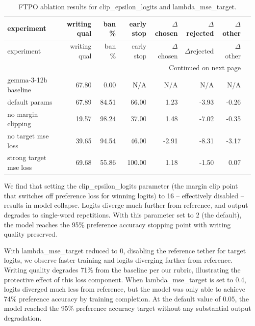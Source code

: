 \documentclass[11pt]{article}
\begin{document}
\setlength\LTleft{0pt}
\setlength\LTright{0pt}
\begin{longtable}{lrrrrrrr}
\caption{FTPO ablation results for clip\_epsilon\_logits and lambda\_mse\_target.\label{tab:ftpo-ablation-results}}\\
\toprule
experiment & writing qual & ban \% & early stop & $\Delta$chosen & $\Delta$rejected & $\Delta$other \\
\midrule
\endfirsthead

\toprule
experiment & writing qual & ban \% & early stop & $\Delta$chosen & $\Delta$rejected & $\Delta$other \\
\midrule
\endhead

\midrule
\multicolumn{7}{r}{Continued on next page} \\
\midrule
\endfoot

\bottomrule
\endlastfoot

gemma-3-12b baseline & 67.80 & 0.00 & N/A & N/A & N/A & N/A \\
default params & 67.89 & 84.51 & 66.00 & 1.23 & -3.93 & -0.26 \\
no margin clipping & 19.57 & 98.24 & 37.00 & 1.48 & -7.02 & -0.35 \\
no target mse loss & 39.65 & 94.54 & 46.00 & -2.91 & -8.31 & -3.17 \\
strong target mse loss & 69.68 & 55.86 & 100.00 & 1.18 & -1.50 & 0.07 \\
\end{longtable}




We find that setting the clip\_epsilon\_logits parameter (the margin clip point that switches off preference loss for winning logits) to 16 -- effectively disabled -- results in model collapse. Logits diverge much further from reference, and output degrades to single-word repetitions. With this parameter set to 2 (the default), the model reaches the 95\% preference accuracy stopping point with writing quality preserved.

With lambda\_mse\_target reduced to 0, disabling the reference tether for target logits, we observe faster training and logits diverging farther from reference. Writing quality degrades 71\%  from the baseline per our rubric, illustrating the protective effect of this loss component. When lambda\_mse\_target is set to 0.4, logits diverged much less from reference, but the model was only able to achieve 74\% preference accuracy by training completion. At the default value of 0.05, the model reached the 95\% preference accuracy target without any substantial output degradation.
\end{document}
